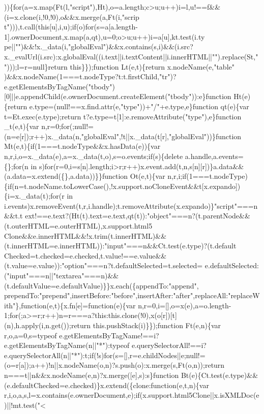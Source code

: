 \begin{DoxyCode}
{      ))\{for(a=x.map(Ft(l,"script"),Ht),o=a.length;c>u;u++)i=l,u!==f&&(i=x.clone(i,!0,!0),o&&x.merge(a,Ft(i,"scrip
      t"))),t.call(this[u],i,u);if(o)for(s=a[a.length-1].ownerDocument,x.map(a,qt),u=0;o>u;u++)i=a[u],kt.test(i.ty
      pe||"")&&!x.\_data(i,"globalEval")&&x.contains(s,i)&&(i.src?x.\_evalUrl(i.src):x.globalEval((i.text||i.textContent||i.innerHTML||"").replace(St,"")));l=r=null\}return this\}\});function Lt(e,t)\{return
       x.nodeName(e,"table"
      )&&x.nodeName(1===t.nodeType?t:t.firstChild,"tr")?e.getElementsByTagName("tbody")[0]||e.appendChild(e.ownerDocument.createElement("tbody")):e\}function Ht(e)\{return
       e.type=(null!==x.find.attr(e,"type"))+"/"+e.type,e\}function qt(e)\{var t=Et.exec(e.type);return t?e.type=t[1]:e.removeAttribute("type"),e\}function \_t(e,t)\{var
       n,r=0;for(;null!=(n=e[r]);r++)x.\_data(n,"globalEval",!t||x.\_data(t[r],"globalEval"))\}function
       Mt(e,t)\{if(1===t.nodeType&&x.hasData(e))\{var n,r,i,o=x.\_data(e),a=x.\_data(t,o),s=o.events;if(s)\{delete
       a.handle,a.events=\{\};for(n in
       s)for(r=0,i=s[n].length;i>r;r++)x.event.add(t,n,s[n][r])\}a.data&&(a.data=x.extend(\{\},a.data))\}\}function Ot(e,t)\{var
       n,r,i;if(1===t.nodeType)\{if(n=t.nodeName.toLowerCase(),!x.support.noCloneEvent&&t[x.expando])\{i=x.\_data(t);for(r in
       i.events)x.removeEvent(t,r,i.handle);t.removeAttribute(x.expando)\}"script"===n&&t.t
      ext!==e.text?(Ht(t).text=e.text,qt(t)):"object"===n?(t.parentNode&&(t.outerHTML=e.outerHTML),x.support.html5
      Clone&&e.innerHTML&&!x.trim(t.innerHTML)&&(t.innerHTML=e.innerHTML)):"input"===n&&Ct.test(e.type)?(t.default
      Checked=t.checked=e.checked,t.value!==e.value&&(t.value=e.value)):"option"===n?t.defaultSelected=t.selected=
      e.defaultSelected:("input"===n||"textarea"===n)&&(t.defaultValue=e.defaultValue)\}\}x.each(\{appendTo:"append",
      prependTo:"prepend",insertBefore:"before",insertAfter:"after",replaceAll:"replaceWith"\},function(e,t)\{x.fn[e]=function(e)\{var
       n,r=0,i=[],o=x(e),a=o.length-1;for(;a>=r;r++)n=r===a?this:this.clone(!0),x(o[r])[t](n),h.apply(i,n.get());return this.pushStack(i)\}\});function Ft(e,n)\{var r,o,a=0,s=typeof
       e.getElementsByTagName!==i?e.getElementsByTagName(n||"*"):typeof
       e.querySelectorAll!==i?e.querySelectorAll(n||"*"):t;if(!s)for(s=[],r=e.childNodes||e;null!=(o=r[a]);a++)!n||x.nodeName(o,n)?s.push(o):x.merge(s,Ft(o,n));return
       n===t||n&&x.nodeName(e,n)?x.merge([e],s):s\}function
       Bt(e)\{Ct.test(e.type)&&(e.defaultChecked=e.checked)\}x.extend(\{clone:function(e,t,n)\{var
       r,i,o,a,s,l=x.contains(e.ownerDocument,e);if(x.support.html5Clone||x.isXMLDoc(e)||!mt.test("<
}
\end{DoxyCode}
